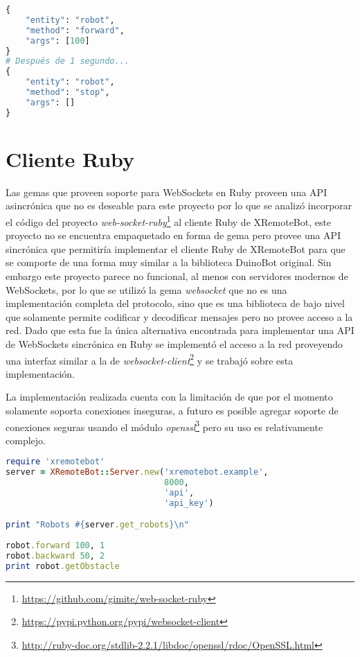 \begin{lstlisting}[language=Python,
caption={Mensajes generados al invocar \texttt{robot.forward(100, 1)} en
XRemoteBot para Python}, label=lst:ejemplo_xremotebot_python_json]
{
    "entity": "robot",
    "method": "forward",
    "args": [100]
}
# Después de 1 segundo...
{
    "entity": "robot",
    "method": "stop",
    "args": []
}
\end{lstlisting}


\section{Cliente Ruby}\label{ch4:ruby}

Las gemas que proveen soporte para WebSockets en Ruby proveen una API
asincrónica que no es deseable para este proyecto por lo que se analizó
incorporar el código del
proyecto
\textit{web-socket-ruby}\footnote{\url{https://github.com/gimite/web-socket-ruby}}
al cliente Ruby de XRemoteBot, este proyecto no se encuentra empaquetado
en forma de gema pero provee una API sincrónica que permitiría implementar
el cliente Ruby de XRemoteBot para que se comporte de una forma muy similar
a la biblioteca DuinoBot original. Sin embargo este proyecto parece no
funcional, al menos con servidores modernos de WebSockets, por lo que se
utilizó la gema \textit{websocket} que no es una implementación completa
del protocolo, sino que es una biblioteca de bajo nivel que
solamente permite codificar y decodificar mensajes pero no provee
acceso a la red. Dado que esta fue la única alternativa encontrada
para implementar una API de WebSockets sincrónica en Ruby se implementó
el acceso a la red proveyendo una interfaz similar a la de
\textit{websocket-client}\footnote{\url{https://pypi.python.org/pypi/websocket-client}}
y se trabajó sobre esta implementación.

La implementación realizada cuenta con la limitación de que por
el momento solamente soporta conexiones inseguras, a futuro es
posible agregar soporte de conexiones seguras usando el módulo
\textit{openssl}\footnote{\url{http://ruby-doc.org/stdlib-2.2.1/libdoc/openssl/rdoc/OpenSSL.html}}
pero su uso es relativamente complejo.

\begin{lstlisting}[language=Ruby,
caption={Ejemplo usando XRemoteBot para Ruby},
label=lst:ejemplo_xremotebot_ruby]
require 'xremotebot'
server = XRemoteBot::Server.new('xremotebot.example',
                                8000,
                                'api',
                                'api_key')

print "Robots #{server.get_robots}\n"
                                                                                                                    robot = Robot.new server, server.fetch_robot
robot.forward 100, 1
robot.backward 50, 2
print robot.getObstacle
\end{lstlisting}



